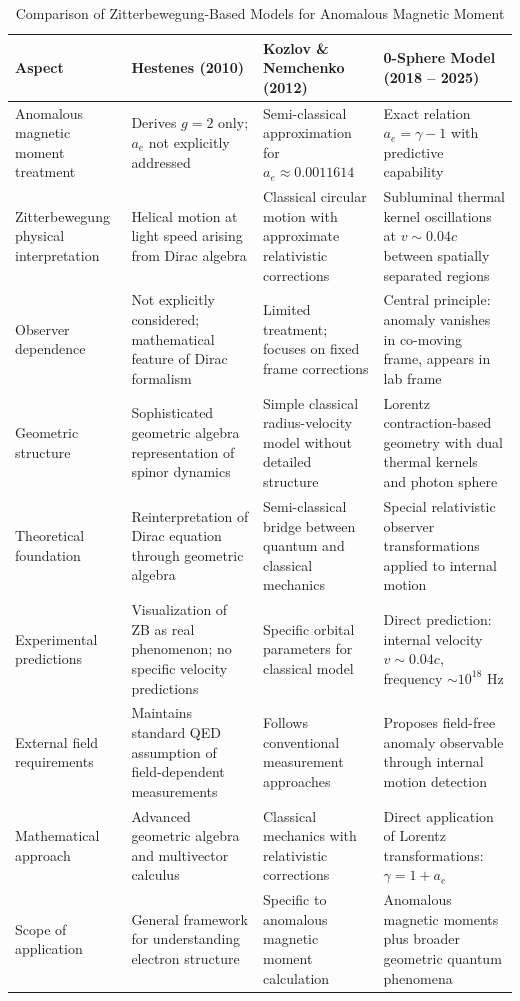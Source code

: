 \documentclass[%
 reprint,
 amsmath,amssymb,
 aps,
]{revtex4-1}
\numberwithin{equation}{section}%
\begin{document}
\begin{table}[t!]
\caption{Comparison of Zitterbewegung-Based Models for Anomalous Magnetic Moment}
\label{tab:zb_comparison}
\renewcommand{\arraystretch}{1.4}
\begin{tabular}{p{4.2cm}p{4.0cm}p{4.0cm}p{4.0cm}}
\toprule
\textbf{Aspect} & \textbf{Hestenes (2010)} & \textbf{Kozlov \& Nemchenko (2012)} & \textbf{0-Sphere Model (2018 -- 2025)} \\
\midrule
Anomalous magnetic moment treatment & Derives $g = 2$ only; $a_e$ not explicitly addressed & Semi-classical approximation for $a_e \approx 0.0011614$ & Exact relation $a_e = \gamma - 1$ with predictive capability \\
\addlinespace[0.3cm]
Zitterbewegung physical interpretation & Helical motion at light speed arising from Dirac algebra & Classical circular motion with approximate relativistic corrections & Subluminal thermal kernel oscillations at $v \sim 0.04c$ between spatially separated regions \\
\addlinespace[0.3cm]
Observer dependence & Not explicitly considered; mathematical feature of Dirac formalism & Limited treatment; focuses on fixed frame corrections & Central principle: anomaly vanishes in co-moving frame, appears in lab frame \\
\addlinespace[0.3cm]
Geometric structure & Sophisticated geometric algebra representation of spinor dynamics & Simple classical radius-velocity model without detailed structure & Lorentz contraction-based geometry with dual thermal kernels and photon sphere \\
\addlinespace[0.3cm]
Theoretical foundation & Reinterpretation of Dirac equation through geometric algebra & Semi-classical bridge between quantum and classical mechanics & Special relativistic observer transformations applied to internal motion \\
\addlinespace[0.3cm]
Experimental predictions & Visualization of ZB as real phenomenon; no specific velocity predictions & Specific orbital parameters for classical model & Direct prediction: internal velocity $v \sim 0.04c$, frequency $\sim 10^{18}$ Hz \\
\addlinespace[0.3cm]
External field requirements & Maintains standard QED assumption of field-dependent measurements & Follows conventional measurement approaches & Proposes field-free anomaly observable through internal motion detection \\
\addlinespace[0.3cm]
Mathematical approach & Advanced geometric algebra and multivector calculus & Classical mechanics with relativistic corrections & Direct application of Lorentz transformations: $\gamma = 1 + a_e$ \\
\addlinespace[0.3cm]
Scope of application & General framework for understanding electron structure & Specific to anomalous magnetic moment calculation & Anomalous magnetic moments plus broader geometric quantum phenomena \\
\bottomrule
\end{tabular}
\end{table}
\end{document}
